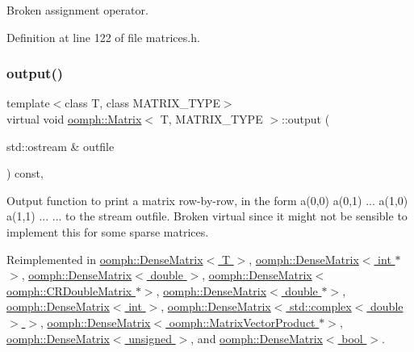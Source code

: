 Broken assignment operator. 



Definition at line 122 of file matrices.\+h.

\mbox{\label{classoomph_1_1Matrix_ace9b59cbe514c77f0b3816b144c740f6}} 
\subsubsection{\texorpdfstring{output()}{output()}}
{\footnotesize\ttfamily template$<$class T, class M\+A\+T\+R\+I\+X\+\_\+\+T\+Y\+PE$>$ \\
virtual void \hyperlink{classoomph_1_1Matrix}{oomph\+::\+Matrix}$<$ T, M\+A\+T\+R\+I\+X\+\_\+\+T\+Y\+PE $>$\+::output (\begin{DoxyParamCaption}\item[{std\+::ostream \&}]{outfile }\end{DoxyParamCaption}) const\hspace{0.3cm}{\ttfamily [inline]}, {\ttfamily [virtual]}}



Output function to print a matrix row-\/by-\/row, in the form a(0,0) a(0,1) ... a(1,0) a(1,1) ... ... to the stream outfile. Broken virtual since it might not be sensible to implement this for some sparse matrices. 



Reimplemented in \hyperlink{classoomph_1_1DenseMatrix_a03e20626e889a1ab4582614f55784165}{oomph\+::\+Dense\+Matrix$<$ T $>$}, \hyperlink{classoomph_1_1DenseMatrix_a03e20626e889a1ab4582614f55784165}{oomph\+::\+Dense\+Matrix$<$ int $\ast$$>$}, \hyperlink{classoomph_1_1DenseMatrix_a03e20626e889a1ab4582614f55784165}{oomph\+::\+Dense\+Matrix$<$ double $>$}, \hyperlink{classoomph_1_1DenseMatrix_a03e20626e889a1ab4582614f55784165}{oomph\+::\+Dense\+Matrix$<$ oomph\+::\+C\+R\+Double\+Matrix $\ast$$>$}, \hyperlink{classoomph_1_1DenseMatrix_a03e20626e889a1ab4582614f55784165}{oomph\+::\+Dense\+Matrix$<$ double $\ast$$>$}, \hyperlink{classoomph_1_1DenseMatrix_a03e20626e889a1ab4582614f55784165}{oomph\+::\+Dense\+Matrix$<$ int $>$}, \hyperlink{classoomph_1_1DenseMatrix_a03e20626e889a1ab4582614f55784165}{oomph\+::\+Dense\+Matrix$<$ std\+::complex$<$ double $>$ $>$}, \hyperlink{classoomph_1_1DenseMatrix_a03e20626e889a1ab4582614f55784165}{oomph\+::\+Dense\+Matrix$<$ oomph\+::\+Matrix\+Vector\+Product $\ast$$>$}, \hyperlink{classoomph_1_1DenseMatrix_a03e20626e889a1ab4582614f55784165}{oomph\+::\+Dense\+Matrix$<$ unsigned $>$}, and \hyperlink{classoomph_1_1DenseMatrix_a03e20626e889a1ab4582614f55784165}{oomph\+::\+Dense\+Matrix$<$ bool $>$}.



